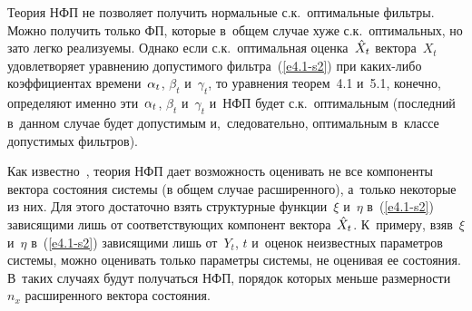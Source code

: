 \begin{multicols}{2}
\smallskip

Теория НФП  не позволяет получить нормальные с.к.\ оптимальные
фильтры. Можно получить только ФП,
которые в~общем случае хуже с.к.\ оптимальных, но зато легко реализуемы.
Однако если с.к.\ оптимальная оценка~$\hat X_t$ вектора~$X_t$
удовлетворяет уравнению допустимого фильтра~(\ref{e4.1-s2}) 
при ка\-ких-ли\-бо коэффициентах времени~$\alpha_t$,
$\beta_t$ и~$\gamma_t$, то уравнения теорем~4.1 и~5.1, 
конечно, определяют именно эти~$\alpha_t$, $\beta_t$
и~$\gamma_t$ и~НФП будет  с.к.\ оптимальным
(последний в~данном случае будет допустимым и,~следовательно,
оптимальным в~классе допустимых фильтров).

Как известно~\cite{3-s2}, теория НФП дает возможность оценивать не все
компоненты вектора состояния системы (в общем случае расширенного),
а~только некоторые из них. Для этого достаточно взять структурные
функции~$\xi$ и~$\eta$ в~(\ref{e4.1-s2}) зависящими лишь от соответствующих
компонент вектора~$\hat X_t$. К~примеру, взяв~$\xi$ и~$\eta$ в~(\ref{e4.1-s2})
зависящими лишь от~$Y_t$, $t$ и~оценок неизвестных параметров
системы, можно оценивать только параметры системы, не оценивая ее
со\-сто\-яния. В~таких случаях будут получаться НФП, порядок которых
меньше размерности~$n_x$ расширенного вектора со\-сто\-яния.


\end{multicols}
